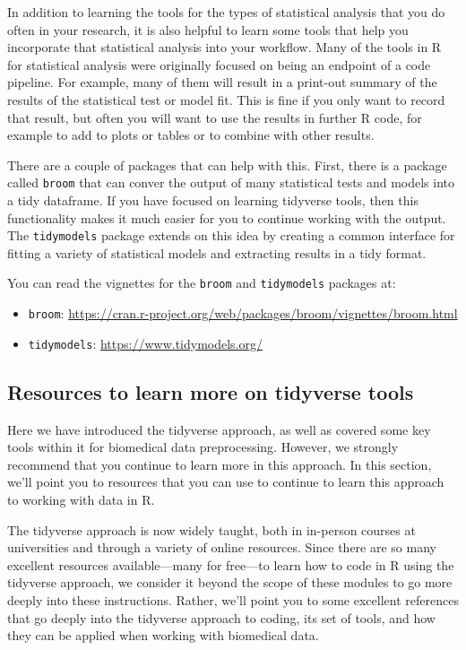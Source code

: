 \documentclass[]{tufte-book}
\providecommand{\tightlist}{%
  \setlength{\itemsep}{0pt}\setlength{\parskip}{0pt}}
\begin{document}
In addition to learning the tools for the types of statistical analysis
that you do often in your research, it is also helpful to learn some tools
that help you incorporate that statistical analysis into your workflow.
Many of the tools in R for statistical analysis were originally focused on
being an endpoint of a code pipeline. For example, many of them will result
in a print-out summary of the results of the statistical test or model fit.
This is fine if you only want to record that result, but often you will
want to use the results in further R code, for example to add to plots or
tables or to combine with other results.

There are a couple of packages that can help with this. First, there is a
package called \texttt{broom} that can conver the output of many statistical
tests and models into a tidy dataframe. If you have focused on learning
tidyverse tools, then this functionality makes it much easier for you to
continue working with the output. The \texttt{tidymodels}
package extends on this idea by creating a common interface for fitting
a variety of statistical models and extracting results in a tidy format.

You can read the vignettes for the \texttt{broom} and \texttt{tidymodels} packages at:

\begin{itemize}
\tightlist
\item
  \texttt{broom}: \url{https://cran.r-project.org/web/packages/broom/vignettes/broom.html}
\item
  \texttt{tidymodels}: \url{https://www.tidymodels.org/}
\end{itemize}

\subsection{Resources to learn more on tidyverse tools}\label{resources-to-learn-more-on-tidyverse-tools}

Here we have introduced the tidyverse approach, as well as covered some key
tools within it for biomedical data preprocessing. However, we strongly
recommend that you continue to learn more in this approach. In this section,
we'll point you to resources that you can use to continue to learn this approach
to working with data in R.

The tidyverse approach is now widely taught, both in in-person courses at
universities and through a variety of online resources.
Since there are so many excellent resources available---many for free---to learn
how to code in R using the tidyverse approach, we consider it beyond the scope
of these modules to go more deeply into these instructions. Rather, we'll
point you to some excellent references that go deeply into the tidyverse
approach to coding, its set of tools, and how they can be applied when
working with biomedical data.
\end{document}
